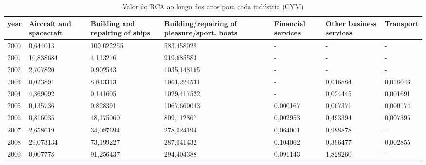 \begin{table}
\centering
\caption{Valor do RCA ao longo dos anos para cada indústria (CYM)}
\begin{tabular}{p{1cm}p{2cm}p{2cm}p{2cm}p{2cm}p{2cm}p{2cm}}
\toprule
 year &  Aircraft and spacecraft &  Building and repairing of ships &  Building/repairing of pleasure/sport. boats &  Financial services &  Other business services &  Transport \\
\midrule
 2000 &                 0,644013 &                       109,022255 &                                   583,458028 &                   - &                        - &          - \\
 2001 &                10,838684 &                         4,113276 &                                   919,685583 &                   - &                        - &          - \\
 2002 &                 2,707820 &                         0,902543 &                                  1035,148165 &                   - &                        - &          - \\
 2003 &                 0,023891 &                         8,843313 &                                  1061,224531 &                   - &                 0,016884 &   0,018046 \\
 2004 &                 4,369092 &                         0,141605 &                                  1029,417522 &                   - &                 0,024445 &   0,001691 \\
 2005 &                 0,135736 &                         0,828391 &                                  1067,660043 &            0,000167 &                 0,067371 &   0,000174 \\
 2006 &                 0,816035 &                        48,175060 &                                   809,112867 &            0,002953 &                 0,493394 &   0,007395 \\
 2007 &                 2,658619 &                        34,087694 &                                   278,024194 &            0,064001 &                 0,988878 &          - \\
 2008 &                29,073134 &                        73,199227 &                                   287,041432 &            0,104062 &                 0,396477 &   0,002855 \\
 2009 &                 0,007778 &                        91,256437 &                                   294,404388 &            0,091143 &                 1,828260 &          - \\

\end{tabular}
\end{table}
